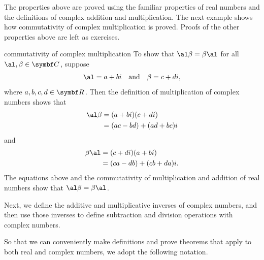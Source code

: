 The properties above are proved using the familiar properties of real numbers and the definitions of complex addition and multiplication. The next example shows how commutativity of complex multiplication is proved. Proofs of the other properties above are left as exercises.

\begin{example}{commutativity of complex multiplication}
To show that $\al \beta = \beta \al$ for all $\al, \beta \in \C{}$,
suppose
\[
\al = a + bi \andd \beta = c + di,
\]
where $a, b, c, d \in \R{}$. Then the definition of multiplication of complex numbers shows that
\begin{align*}
\al \beta &= (a + bi)(c + di) \\
&= (ac - bd) + (ad + bc)i
\end{align*}
and
\begin{align*}
\beta\al &= (c + di)(a + bi) \\
&= (ca - db) + (cb + da)i.
\end{align*}
The equations above and the commutativity of multiplication and addition of real numbers show that $\al \beta = \beta \al$.
\end{example}

Next, we define the additive and multiplicative inverses of complex numbers, and then use those inverses to define subtraction and division operations with complex numbers.


So that we can conveniently make definitions and prove theorems that apply to both real and complex numbers, we adopt the following notation.

